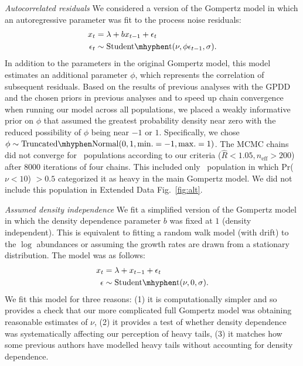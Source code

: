 \emph{Autocorrelated residuals} We considered a version of the Gompertz model in which an autoregressive parameter was fit to the process noise residuals:
\begin{align}
x_t &= \lambda + b x_{t-1} + \epsilon_t\\
\epsilon_t &\sim \mathrm{Student\mhyphen t}(\nu, \phi \epsilon_{t-1}, \sigma).
\end{align}
In addition to the parameters in the original Gompertz model, this model estimates an additional parameter \(\phi\), which represents the correlation of subsequent residuals. Based on the results of previous analyses with the GPDD\cite{connors2014} and the chosen priors in previous analyses\cite{thorson2014a} and to speed up chain convergence when running our model across all populations, we placed a weakly informative prior on \(\phi\) that assumed the greatest probability density near zero with the reduced possibility of \(\phi\) being near \(-1\) or \(1\). Specifically, we chose \(\phi \sim \mathrm{Truncated\mhyphen Normal}(0, 1, \mathrm{min.} = -1, \mathrm{max.} = 1)\). The MCMC chains did not converge for \modelsNoConvergeAROne\ populations according to our criteria (\(\widehat{R} < 1.05, n_\mathrm{eff} > 200\)) after 8000 iterations of four chains. This included only \modelsNoConvergeAROneHeavyBase\ population in which Pr(\(\nu < 10\)) \(> 0.5\) categorized it as heavy in the main Gompertz model. We did not include this population in Extended Data Fig.~\ref{fig:alt}.

\emph{Assumed density independence} We fit a simplified version of the Gompertz model in which the density dependence parameter \(b\) was fixed at \(1\) (density independent). This is equivalent to fitting a random walk model (with drift) to the \(\log\) abundances or assuming the growth rates are drawn from a stationary distribution. The model was as follows:
\begin{align}
x_t &= \lambda + x_{t-1} + \epsilon_t\\
\epsilon &\sim \mathrm{Student\mhyphen t}(\nu, 0, \sigma).
\end{align}
We fit this model for three reasons: (1) it is computationally simpler and so provides a check that our more complicated full Gompertz model was obtaining reasonable estimates of \(\nu\), (2) it provides a test of whether density dependence was systematically affecting our perception of heavy tails, (3) it matches how some previous authors have modelled heavy tails without accounting for density dependence\cite{segura2013}.

